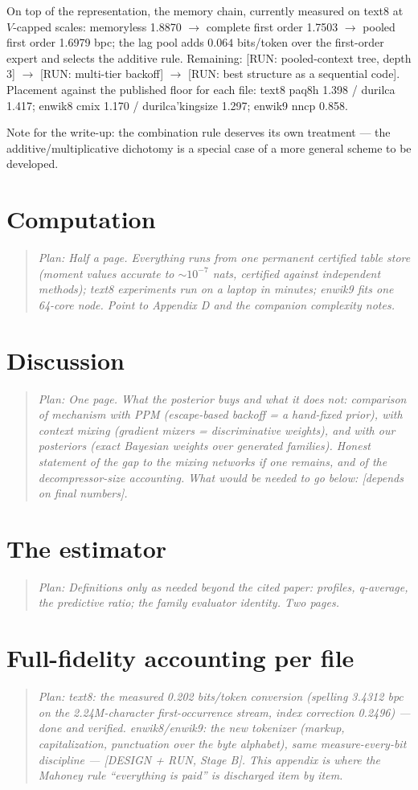 \documentclass[11pt]{article}
\newcommand{\planned}[1]{\begin{quote}\small\itshape Plan: #1\end{quote}}
\begin{document}
{On top of the representation, the memory chain, currently measured on
text8 at $V$-capped scales: memoryless 1.8870 $\to$ complete first
order 1.7503 $\to$ pooled first order 1.6979 bpc; the lag pool adds
$0.064$ bits/token over the first-order expert and selects the
additive rule.  Remaining: [RUN: pooled-context tree, depth 3] $\to$
[RUN: multi-tier backoff] $\to$ [RUN: best structure as a sequential
code].  Placement against the published floor for each file: text8
paq8h 1.398 / durilca 1.417; enwik8 cmix 1.170 / durilca'kingsize
1.297; enwik9 nncp 0.858.

Note for the write-up: the combination rule deserves its own
treatment --- the additive/multiplicative dichotomy is a special case
of a more general scheme to be developed.}

\section{Computation}
\planned{Half a page.  Everything runs from one permanent certified
table store (moment values accurate to $\sim 10^{-7}$ nats, certified
against independent methods); text8 experiments run on a laptop in
minutes; enwik9 fits one 64-core node.  Point to Appendix D and the
companion complexity notes.}

\section{Discussion}
\planned{One page.  What the posterior buys and what it does not:
comparison of mechanism with PPM (escape-based backoff = a hand-fixed
prior), with context mixing (gradient mixers = discriminative
weights), and with our posteriors (exact Bayesian weights over
generated families).  Honest statement of the gap to the mixing
networks if one remains, and of the decompressor-size accounting.
What would be needed to go below: [depends on final numbers].}

\appendix

\section{The estimator}
\planned{Definitions only as needed beyond the cited paper: profiles,
q-average, the predictive ratio; the family evaluator identity.  Two
pages.}

\section{Full-fidelity accounting per file}
\planned{text8: the measured 0.202 bits/token conversion (spelling
3.4312 bpc on the 2.24M-character first-occurrence stream, index
correction 0.2496) --- done and verified.  enwik8/enwik9: the new
tokenizer (markup, capitalization, punctuation over the byte
alphabet), same measure-every-bit discipline --- [DESIGN + RUN,
Stage B].  This appendix is where the Mahoney rule ``everything is
paid'' is discharged item by item.}
\end{document}
